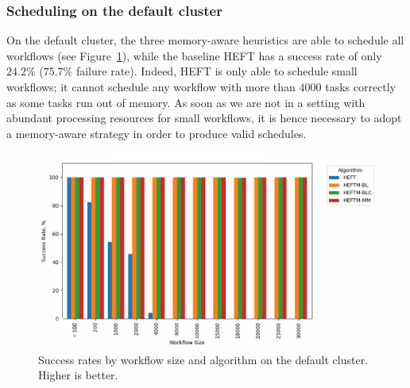 \documentclass[conference]{IEEEtran}
\newcommand{\algo}[1]{\textsc{#1}}
\newcommand{\heft}{\algo{HEFT}\xspace}
\begin{document}
\subsubsection{Scheduling on the default cluster}
%
%
On the default cluster,  the three memory-aware heuristics are able to schedule all workflows
(see Figure~\ref{fig:success-rates-large}), while
the baseline \heft has a success rate of only $24.2\%$ ($75.7\%$ failure rate).
Indeed, \heft is only able to schedule small workflows; it cannot schedule any workflow 
with more than $4000$ tasks correctly as some tasks run out of memory. As soon as we are not in a setting
with abundant processing resources for small workflows, it is hence necessary to adopt
a memory-aware strategy in order to produce valid schedules.

\begin{figure}[tb]
  \centering
  \vspace{-0.4cm}
  \includegraphics[width=1.0\columnwidth] {images/success-rates-large2}
  \caption{Success rates by workflow size and algorithm on the default cluster. Higher is better.}
  \label{fig:success-rates-large}
\end{figure}
\end{document}
